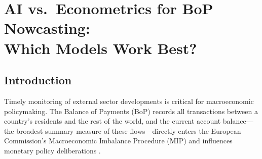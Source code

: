 \chapter{AI vs.\ Econometrics for BoP Nowcasting:\\Which Models Work Best?}
\label{ch:model_comparison}

\begin{abstract}
This chapter conducts a systematic comparison of econometric and machine-learning approaches for nowcasting France's quarterly current account balance.  Ten models---AR(1), AR(4), Dynamic Factor Model, Bridge equation, Ridge regression, LASSO, Gradient Boosting, XGBoost, LSTM, and GRU---are evaluated on both quarterly current account and monthly goods trade data over 2003--2022 using an expanding-window protocol with a minimum training sample of 40~quarters (10~years).  Ridge regression delivers the largest and most robust improvement: a~26.3\% RMSE reduction over AR(1) at the quarterly frequency, significant at the~5\% level via the \citet{diebold1995comparing} test ($p = 0.013$) and at the~1\% level via the \citet{clark2007approximately} nested-model test ($p < 0.001$), with an out-of-sample~$R^2$ of~0.46.  Traditional econometric approaches (DFM, Bridge) offer moderate but less consistent gains.  Complex nonlinear methods---Gradient Boosting, XGBoost---improve on the benchmark but are outperformed by Ridge.  Both LSTM (${+}1.0$\% RMSE) and GRU (${+}1.0$\%) fail entirely, confirming that deep learning---regardless of recurrent architecture---is ill-suited to the small-sample macroeconomic setting.  These results corroborate \citet{gouletcoulombe2022how}'s finding that regularised linear models dominate in low-dimensional macroeconomic forecasting.
\end{abstract}


\section{Introduction}
\label{sec:ch1_intro}

Timely monitoring of external sector developments is critical for macroeconomic policymaking.  The Balance of Payments (BoP) records all transactions between a country's residents and the rest of the world, and the current account balance---the broadest summary measure of these flows---directly enters the European Commission's Macroeconomic Imbalance Procedure (MIP) and influences monetary policy deliberations \citep{obstfeld2012does, eu2016mip}.

